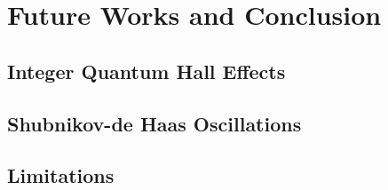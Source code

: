 \chapter{Future Works and Conclusion}\label{chap:conclusion}
\section{Integer Quantum Hall Effects}\label{sec:heading31}

\section{Shubnikov-de Haas Oscillations}\label{sec:sdh_oscillations}

\section{Limitations}\label{sec:limitations}